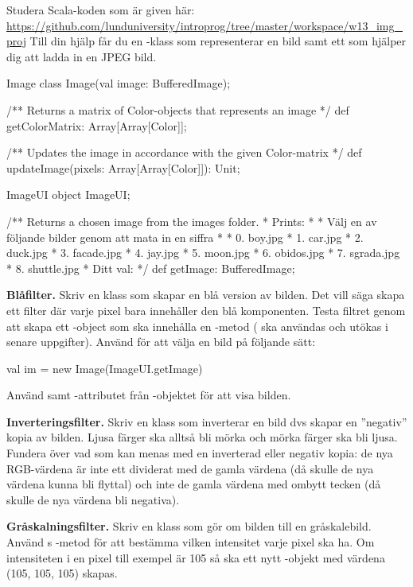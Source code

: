 Studera Scala-koden som är given här: \url{https://github.com/lunduniversity/introprog/tree/master/workspace/w13_img_proj}
Till din hjälp får du en -klass som representerar en bild samt ett  som hjälper dig att ladda in en JPEG bild.

\begin{ScalaSpec}{Image}
class Image(val image: BufferedImage);

/** Returns a matrix of Color-objects that represents an image */
def getColorMatrix: Array[Array[Color]];

/** Updates the image in accordance with the given Color-matrix */
def updateImage(pixels: Array[Array[Color]]): Unit;
\end{ScalaSpec}


\begin{ScalaSpec}{ImageUI}
object ImageUI;

/** Returns a chosen image from the images folder.
*   Prints:
*
*   Välj en av följande bilder genom att mata in en siffra
*
*   0. boy.jpg
*   1. car.jpg
*   2. duck.jpg
*   3. facade.jpg
*   4. jay.jpg
*   5. moon.jpg
*   6. obidos.jpg
*   7. sgrada.jpg
*   8. shuttle.jpg
*   Ditt val:
*/
def getImage: BufferedImage;
\end{ScalaSpec}


\Task \textbf{Blåfilter.} Skriv en klass  som skapar en blå version av bilden. Det vill säga skapa ett filter där varje pixel bara innehåller den blå komponenten. Testa filtret genom att skapa ett -object som ska innehålla en -metod ( ska användas och utökas i senare uppgifter). Använd  för att välja en bild på följande sätt:
\begin{Code}
val im = new Image(ImageUI.getImage)
\end{Code}
Använd  samt -attributet från -objektet för att visa bilden.

\Task \textbf{Inverteringsfilter.} Skriv en klass  som inverterar en bild dvs skapar en ''negativ'' kopia av bilden. Ljusa färger ska alltså bli mörka och mörka färger ska bli ljusa.
Fundera över vad som kan menas med en inverterad eller negativ kopia: de nya RGB-värdena är inte ett dividerat med de gamla värdena (då skulle de nya värdena kunna bli flyttal) och inte de gamla värdena med ombytt tecken (då skulle de nya värdena bli negativa).

\Task \textbf{Gråskalningsfilter.} Skriv en klass  som gör om bilden till en gråskalebild. Använd s -metod för att bestämma vilken intensitet varje pixel ska ha. Om intensiteten i en pixel till exempel är 105 så ska ett nytt -objekt med värdena (105, 105, 105) skapas.

